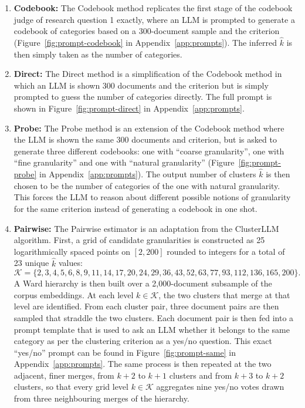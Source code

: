 \documentclass[11pt,a4paper,oneside]{report}
\begin{document}
\begin{enumerate}
\item \textbf{Codebook:} The Codebook method replicates the first stage of the codebook judge of research question 1 exactly, where an LLM is prompted to generate a codebook of categories based on a 300-document sample and the criterion (Figure~\ref{fig:prompt-codebook} in Appendix~\ref{app:prompts}). The inferred $\hat{k}$ is then simply taken as the number of categories.
\item \textbf{Direct:} The Direct method is a simplification of the Codebook method in which an LLM is shown 300 documents and the criterion but is simply prompted to guess the number of categories directly. The full prompt is shown in Figure~\ref{fig:prompt-direct} in Appendix~\ref{app:prompts}.
\item \textbf{Probe:} The Probe method is an extension of the Codebook method where the LLM is shown the same 300 documents and criterion, but is asked to generate three different codebooks: one with ``coarse granularity'', one with ``fine granularity'' and one with ``natural granularity'' (Figure~\ref{fig:prompt-probe} in Appendix~\ref{app:prompts}). The output number of clusters $\hat{k}$ is then chosen to be the number of categories of the one with natural granularity. This forces the LLM to reason about different possible notions of granularity for the same criterion instead of generating a codebook in one shot.
\item \textbf{Pairwise:} The Pairwise estimator is an adaptation from the ClusterLLM \citep{zhang2023clusterllm} algorithm. First, a grid of candidate granularities is constructed as 25 logarithmically spaced points on $[2, 200]$ rounded to integers for a total of 23 unique $\hat{k}$ values:
\[
\mathcal{K} = \{2, 3, 4, 5, 6, 8, 9, 11, 14, 17, 20, 24, 29, 36, 43, 52, 63, 77, 93, 112, 136, 165, 200\}.
\]
A Ward hierarchy is then built over a 2{,}000-document subsample of the corpus embeddings. At each level $k \in \mathcal{K}$, the two clusters that merge at that level are identified. From each cluster pair, three document pairs are then sampled that straddle the two clusters. Each document pair is then fed into a prompt template that is used to ask an LLM whether it belongs to the same category as per the clustering criterion as a yes/no question. This exact ``yes/no'' prompt can be found in Figure~\ref{fig:prompt-same} in Appendix~\ref{app:prompts}. The same process is then repeated at the two adjacent, finer merges, from $k+2$ to $k+1$ clusters and from $k+3$ to $k+2$ clusters, so that every grid level $k \in \mathcal{K}$ aggregates nine yes/no votes drawn from three neighbouring merges of the hierarchy.


\end{enumerate}
\end{document}
